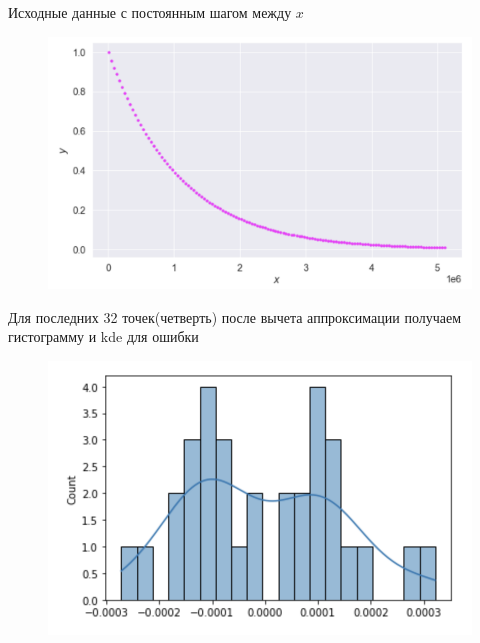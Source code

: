 \documentclass{beamer}      %
\begin{document}
\begin{frame}[fragile]
    Исходные данные с постоянным шагом между $x$

    \begin{figure}[ht]
        \includegraphics[width=1.0\textwidth]{Рис1}
    \end{figure}


\end{frame}

\begin{frame}
    Для последних 32 точек(четверть) после вычета аппроксимации получаем гистограмму и kde для ошибки

    \begin{figure}[ht]
        \includegraphics[width=1.0\textwidth]{Гистограмма}
    \end{figure}

\end{frame}
\end{document}
